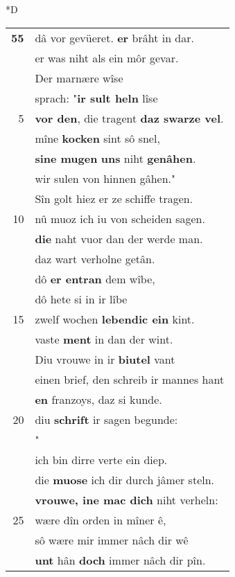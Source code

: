 \documentclass[8pt,a4paper,notitlepage]{article}
\begin{document}
\begin{table}[ht]
\begin{minipage}[t]{0.5\linewidth}
\small
\begin{center}*D
\end{center}
\begin{tabular}{rl}
\textbf{55} & dâ vor gevüeret. \textbf{er} brâht in dar.\\ 
 & er was niht als ein môr gevar.\\ 
 & Der marnære wîse\\ 
 & sprach: "\textbf{ir sult heln} lîse\\ 
5 & \textbf{vor den}, die tragent \textbf{daz swarze vel}.\\ 
 & mîne \textbf{kocken} sint sô snel,\\ 
 & \textbf{sine mugen} \textbf{uns} niht \textbf{genâhen}.\\ 
 & wir sulen von hinnen gâhen."\\ 
 & Sîn golt hiez er ze schiffe tragen.\\ 
10 & nû muoz ich iu von scheiden sagen.\\ 
 & \textbf{die} naht vuor dan der werde man.\\ 
 & daz wart verholne getân.\\ 
 & dô \textbf{er entran} dem wîbe,\\ 
 & dô hete si in ir lîbe\\ 
15 & zwelf wochen \textbf{lebendic ein} kint.\\ 
 & vaste \textbf{ment} in dan der wint.\\ 
 & Diu vrouwe in ir \textbf{biutel} vant\\ 
 & einen brief, den schreib ir mannes hant\\ 
 & \textbf{en} franzoys, daz si kunde.\\ 
20 & diu \textbf{schrift} ir sagen begunde:\\ 
 & "\textit{\begin{large}H\end{large}}ie \textbf{enbiutet} liep ein ander liep.\\ 
 & ich bin dirre verte ein diep.\\ 
 & die \textbf{muose} ich dir durch jâmer steln.\\ 
 & \textbf{vrouwe, ine mac dich} niht verheln:\\ 
25 & wære dîn orden in mîner ê,\\ 
 & sô wære mir immer nâch dir wê\\ 
 & \textbf{unt} hân \textbf{doch} immer nâch dir pîn.\\ 

\end{tabular}
\end{minipage}
\end{table}
\end{document}
